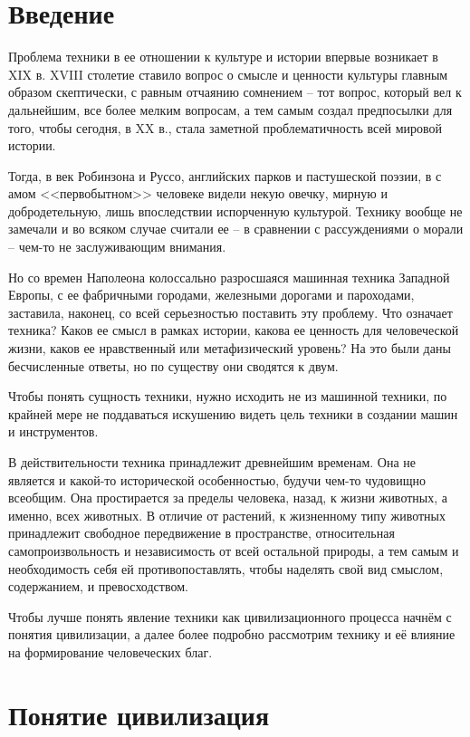 \section{Введение}

Проблема техники в ее отношении к культуре и истории впервые возникает в 
XIX в. XVIII столетие ставило вопрос о смысле и ценности культуры главным 
образом скептически, с равным отчаянию сомнением -- тот вопрос, который вел к 
дальнейшим, все более мелким вопросам, а тем самым создал предпосылки для 
того, чтобы сегодня, в XX в., стала заметной проблематичность всей мировой 
истории.

Тогда, в век Робинзона и Руссо, английских парков и пастушеской поэзии, в с
амом <<первобытном>> человеке видели некую овечку, мирную и добродетельную, 
лишь впоследствии испорченную культурой. Технику вообще не замечали и во 
всяком случае считали ее -- в сравнении с рассуждениями о морали -- чем-то не 
заслуживающим внимания.

Но со времен Наполеона колоссально разросшаяся машинная техника Западной 
Европы, с ее фабричными городами, железными дорогами и пароходами, заставила, 
наконец, со всей серьезностью поставить эту проблему. Что означает техника? 
Каков ее смысл в рамках истории, какова ее ценность для человеческой жизни, 
каков ее нравственный или метафизический уровень? На это были даны 
бесчисленные ответы, но по существу они сводятся к двум.

Чтобы понять сущность техники, нужно исходить не из машинной техники, по 
крайней мере не поддаваться искушению видеть цель техники в создании машин и 
инструментов.

В действительности техника принадлежит древнейшим временам. Она не является и 
какой-то исторической особенностью, будучи чем-то чудовищно всеобщим. Она 
простирается за пределы человека, назад, к жизни животных, а именно, всех 
животных. В отличие от растений, к жизненному типу животных принадлежит 
свободное передвижение в пространстве, относительная самопроизвольность и 
независимость от всей остальной природы, а тем самым и необходимость себя ей 
противопоставлять, чтобы наделять свой вид смыслом, содержанием, и 
превосходством. \cite{bib:06}

Чтобы лучше понять явление техники как цивилизационного процесса начнём с 
понятия цивилизации, а далее более подробно рассмотрим технику и её влияние 
на формирование человеческих благ.

\section{Понятие цивилизация}


